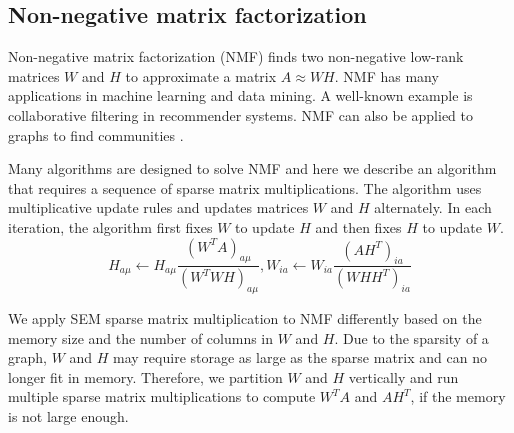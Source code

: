 \subsection{Non-negative matrix factorization}
Non-negative matrix factorization (NMF) \cite{nmf} finds two non-negative
low-rank matrices $W$ and $H$ to approximate a matrix $A \approx WH$. NMF
has many applications in machine learning
and data mining. A well-known example is collaborative filtering \cite{cf} in
recommender systems. NMF can also be applied to graphs to find communities
\cite{yang13, wang11}.

Many algorithms are designed to solve NMF and here we describe an algorithm
\cite{nmf} that requires a sequence of sparse matrix multiplications.
The algorithm uses multiplicative update rules and updates matrices $W$ and $H$
alternately. In each iteration, the algorithm first fixes $W$ to update $H$
and then fixes $H$ to update $W$.
\begin{equation*}
H_{a\mu} \leftarrow H_{a\mu} \frac{{(W^TA)}_{a\mu}}{{(W^TWH)}_{a\mu}},
W_{ia} \leftarrow W_{ia} \frac{{(AH^T)}_{ia}}{{(WHH^T)}_{ia}}
\end{equation*}

We apply SEM sparse matrix multiplication to NMF differently
based on the memory size and the number of columns in $W$ and $H$. Due to
the sparsity of a graph, $W$ and $H$ may require storage as large as
the sparse matrix and can no longer fit in
memory. Therefore, we partition $W$ and $H$ vertically and run multiple
sparse matrix multiplications to compute $W^TA$ and $AH^T$, if the memory is not
large enough.

